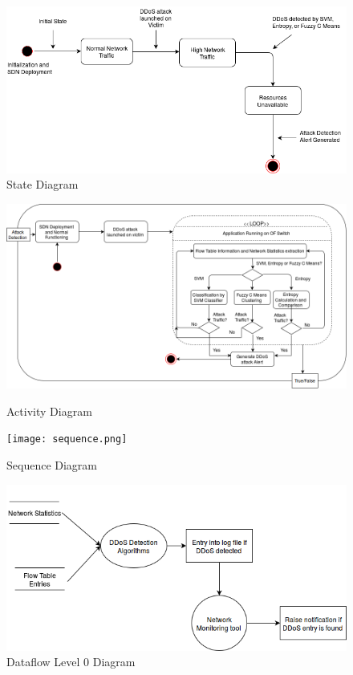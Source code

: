 \documentclass[12pt,a4paper,final]{report}
\begin{document}
{{{{{\begin{figure}[h]
\begin{center}
\includegraphics[scale=0.5]{state.png}
\caption{State Diagram}
\end{center}
\end{figure}

\begin{figure}
\begin{center}
\includegraphics[scale=0.5]{activity.png}
\caption{Activity Diagram}

\vspace{1cm}
\texttt{[image: sequence.png]}
\caption{Sequence Diagram}
\end{center}
\end{figure}

\begin{figure}
\begin{center}
\includegraphics[scale=0.5]{dataflow0.png}
\caption{Dataflow Level 0 Diagram}


\end{center}
\end{figure}}}}}}
\end{document}
